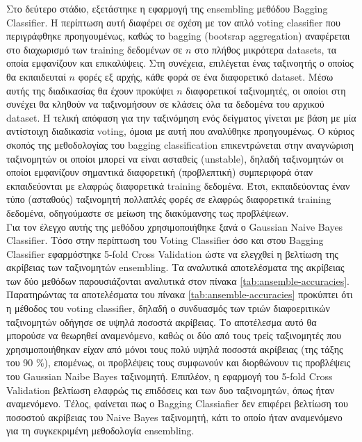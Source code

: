 \documentclass[11pt]{article} %
\begin{document}
Στο δεύτερο στάδιο, εξετάστηκε η εφαρμογή της ensembling μεθόδου Bagging Classifier. Η περίπτωση αυτή διαφέρει σε σχέση με τον απλό voting classifier που περιγράφθηκε προηγουμένως, καθώς το bagging (bootsrap aggregation) αναφέρεται στο διαχωρισμό των training δεδομένων σε $n$ στο πλήθος μικρότερα datasets, τα οποία εμφανίζουν και επικαλύψεις. Στη συνέχεια, επιλέγεται ένας ταξινοητής ο οποίος θα εκπαιδευταί $n$ φορές εξ αρχής, κάθε φορά σε ένα διαφορετικό dataset. Μέσω αυτής της διαδικασίας θα έχουν προκύψει $n$ διαφορετικοί ταξινομητές, οι οποίοι στη συνέχει θα κληθούν να ταξινομήσουν σε κλάσεις όλα τα δεδομένα του αρχικού dataset. Η τελική απόφαση για την ταξινόμηση ενός δείγματος γίνεται με βάση με μία αντίστοιχη διαδικασία voting, όμοια με αυτή που αναλύθηκε προηγουμένως. Ο κύριος σκοπός της μεθοδολογίας του bagging classification επικεντρώνεται στην αναγνώριση ταξινομητών οι οποίοι μπορεί να είναι ασταθείς (unstable), δηλαδή ταξινομητών οι οποίοι εμφανίζουν σημαντικά διαφορετική (προβλεπτική) συμπεριφορά όταν εκπαιδεύονται με ελαφρώς διαφορετικά training δεδομένα. Έτσι, εκπαιδεύοντας έναν τύπο (ασταθούς) ταξινομητή πολλαπλές φορές σε ελαφρώς διαφορετικά training δεδομένα, οδηγούμαστε σε μείωση της διακύμανσης τως προβλέψεων.\\

Για τον έλεγχο αυτής της μεθόδου χρησιμοποιήθηκε ξανά ο Gaussian Naive Bayes Classifier. Τόσο στην περίπτωση του Voting Classifier όσο και στου Bagging Classifier εφαρμόστηκε 5-fold Cross Validation ώστε να ελεγχθεί η βελτίωση της ακρίβειας των ταξινομητών ensembling. Τα αναλυτικά αποτελέσματα της ακρίβειας των δύο μεθόδων παρουσιάζονται αναλυτικά στον πίνακα \ref{tab:ansemble-accuracies}.\\

Παρατηρώντας τα αποτελέσματα του πίνακα \ref{tab:ansemble-accuracies} προκύπτει ότι η μέθοδος του voting classifier, δηλαδή ο συνδυασμός των τριών διαφοεριτικών ταξινομητών οδήγησε σε υψηλά ποσοστά ακρίβειας. Το αποτέλεσμα αυτό θα μπορούσε να θεωρηθεί αναμενόμενο, καθώς οι δύο από τους τρείς ταξινομητές που χρησιμοποιήθηκαν είχαν από μόνοι τους πολύ υψηλά ποσοστά ακρίβειας (της τάξης του 90 \%), επομένως, οι προβλέψεις τους συμφωνούν και διορθώνουν τις προβλέψεις του Gaussian Naibe Bayes ταξινομητή. Επιπλέον, η εφαρμογή του 5-fold Cross Validation βελτίωση ελαφρώς τις επιδόσεις και των δυο ταξινομητών, όπως ήταν αναμενόμενο. Τέλος, φαίνεται πως ο Bagging Classiafier δεν επιφέρει βελτίωση του ποσοστού ακρίβειας του Naive Bayes ταξινομητή, κάτι το οποίο ήταν αναμενόμενο για τη συγκεκριμένη μεθοδολογία ensembling. \\
\end{document}
